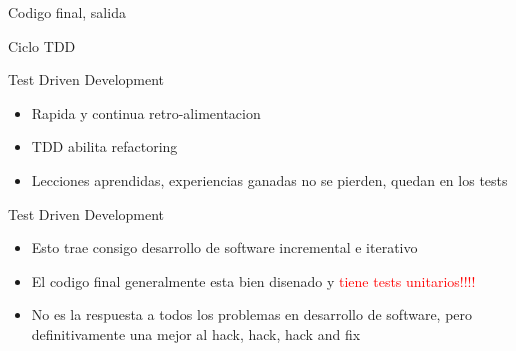 \begin{frame}{Codigo final, salida} 
\end{frame}


\begin{frame}{Ciclo TDD}
    \begin{center}
    \end{center}
\end{frame}

\begin{frame}{Test Driven Development} 
    \begin{itemize}
        \item Rapida y continua retro-alimentacion
        \item TDD abilita refactoring
        \item Lecciones aprendidas, experiencias ganadas no se pierden, quedan en los tests
    \end{itemize}
\end{frame}

\begin{frame}{Test Driven Development} 
    \begin{itemize}
        \item Esto trae consigo desarrollo de software incremental e iterativo
        \item El codigo final generalmente esta bien disenado y 
            \textcolor{red}{tiene tests unitarios!!!!}
        \item No es la respuesta a todos los problemas en desarrollo de software, pero
            definitivamente una mejor al hack, hack, hack and fix
    \end{itemize}
\end{frame}
